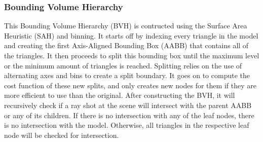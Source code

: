 \documentclass{article}
\begin{document}
    \subsubsection{Bounding Volume Hierarchy}
    This Bounding Volume Hierarchy (BVH) is contructed using the Surface Area Heuristic (SAH) and binning. 
    It starts off by indexing every triangle in the model and creating the first Axis-Aligned Bounding Box 
    (AABB) that contains all of the triangles. It then proceeds to split this bounding box until the maximum 
    level or the minimum amount of triangles is reached. Splitting relies on the use of alternating axes and 
    bins to create a split boundary. It goes on to compute the cost function of these new splits, and only 
    creates new nodes for them if they are more efficient to use than the original. After constructing the 
    BVH, it will recursively check if a ray shot at the scene will intersect with the parent AABB or any of 
    its children. If there is no intersection with any of the leaf nodes, there is no intersection with the 
    model. Otherwise, all triangles in the respective leaf node will be checked for intersection.
\end{document}

